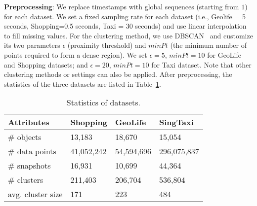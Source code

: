 \textbf{Preprocessing}: We replace timestamps with global sequences (starting from $1$) for each dataset. 
We set a fixed sampling rate for each dataset (i.e., Geolife = 5 seconds, Shopping=0.5 seconds, Taxi = 30 seconds)
and use linear interpolation to fill missing values.
For the clustering method, we use DBSCAN~\cite{ester1996density} and customize its two parameters $\epsilon$ (proximity threshold) and $minPt$ (the minimum number of points required to form a dense region). We set $\epsilon=5$, $minPt=10$ for GeoLife and Shopping datasets; and $\epsilon=20$, $minPt=10$ for Taxi dataset. Note that other clustering methods or settings can also be applied. 
After preprocessing, the statistics of the three datasets are listed in Table~\ref{exp:dataset}. 

\begin{table} [h]
\center
\small
\begin{tabular}{|l|l|l|l|}
\hline
 \textbf{Attributes}& \textbf{Shopping} &  \textbf{GeoLife} &  \textbf{SingTaxi} \\ 
\hline 
\# objects  & 13,183 & 18,670 & 15,054\\ 
\hline
\# data points  & 41,052,242 & 54,594,696 & 296,075,837\\ 
\hline
\# snapshots  & 16,931 & 10,699 & 44,364\\ 
\hline
\# clusters  & 211,403  & 206,704& 536,804\\
\hline
avg. cluster size  & 171 & 223 & 484\\
\hline
\end{tabular}
\caption{Statistics of datasets.}
\label{exp:dataset}
\end{table}

